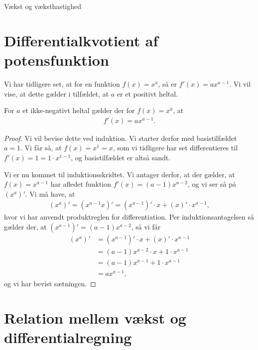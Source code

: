
\begin{center}
\Huge
Vækst og væksthastighed
\end{center}
\section*{Differentialkvotient af potensfunktion}
Vi har tidligere set, at for en funktion $f(x) = x^a$, så er $f'(x) = ax^{a-1}$. Vi vil vise, at dette gælder i tilfældet, at $a$ er et positivt heltal.  
\begin{setn}
For $a$ et ikke-negativt heltal gælder der for $f(x) = x^a$, at 
\begin{align*}
f'(x) = ax^{a-1}.
\end{align*}
\end{setn}
\begin{proof}
Vi vil bevise dette ved induktion. Vi starter derfor med basistilfældet $a = 1$. Vi får så, at 
$f(x) = x^1 = x$, som vi tidligere har set differentieres til $f'(x) = 1 = 1\cdot x^{1-1}$, og basistilfældet er altså sandt. 

Vi er nu kommet til induktionsskridtet. Vi antager derfor, at der gælder, at $f(x) = x^{a-1}$ har afledet funktion $f'(x) = (a-1)x^{a-2}$, og vi ser så på $(x^a)'$.
Vi må have, at 
\begin{align*}
(x^a)' = (x^{a-1}x)' = (x^{a-1})'\cdot x + (x)'\cdot x^{a-1},
\end{align*}
hvor vi har anvendt produktreglen for differentiation. Per induktionsantagelsen så gælder der, at $(x^{a-1})' = (a-1)x^{a-2}$, så vi får
\begin{align*}
(x^a)' &=  (x^{a-1})'\cdot x + (x)'\cdot x^{a-1}\\
&= (a-1)x^{a-2}\cdot x + 1\cdot x^{a-1}\\
&= (a-1)x^{a-1} + 1\cdot x^{a-1}\\
&= ax^{a-1},
\end{align*}
og vi har bevist sætningen. 
\end{proof}
\section*{Relation mellem vækst og differentialregning}

